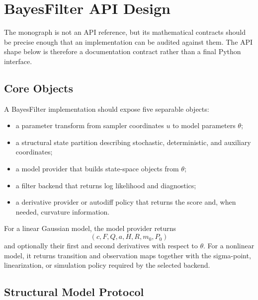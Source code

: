 \chapter{BayesFilter API Design}
\label{ch:bf-api-design}

The monograph is not an API reference, but its mathematical contracts should be
precise enough that an implementation can be audited against them.  The API
shape below is therefore a documentation contract rather than a final Python
interface.

\section{Core Objects}
\label{sec:bf-api-core-objects}

A BayesFilter implementation should expose five separable objects:
\begin{itemize}
  \item a parameter transform from sampler coordinates $u$ to model parameters
    $\theta$;
  \item a structural state partition describing stochastic, deterministic, and
    auxiliary coordinates;
  \item a model provider that builds state-space objects from $\theta$;
  \item a filter backend that returns log likelihood and diagnostics;
  \item a derivative provider or autodiff policy that returns the score and,
    when needed, curvature information.
\end{itemize}

For a linear Gaussian model, the model provider returns
\[
  (c,F,Q,a,H,R,m_0,P_0)
\]
and optionally their first and second derivatives with respect to $\theta$.
For a nonlinear model, it returns transition and observation maps together with
the sigma-point, linearization, or simulation policy required by the selected
backend.

\section{Structural Model Protocol}
\label{sec:bf-api-structural-model-protocol}

